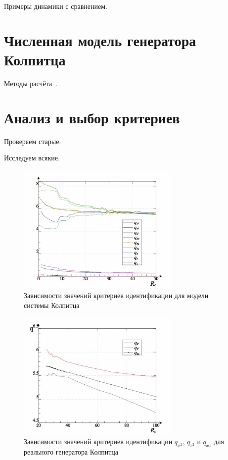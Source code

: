 Примеры динамики с сравнением.


\section{Численная модель генератора Колпитца}  %

Методы расчёта~\cite{zaeplnii_radio_calc}.


\section{Анализ и выбор критериев}  %

Проверяем старые.

Исследуем всякие.

\begin{figure}[htb!]
\centerline{\includegraphics[width=0.7\textwidth]{p/colp_bjt_q-p_Rc_q.png} }
\caption{Зависимости значений критериев идентификации для модели системы Колпитца}
\label{atu:f:colp_bjt_q-p_Rc_q}
\end{figure}


\begin{figure}[htb!]
\centerline{\includegraphics[width=0.7\textwidth]{p/colp_read_q-p_Rc_q.png} }
  \caption{Зависимости значений критериев идентификации $q_{x^2}$, $q_{z^2}$ и $q_{xz}$ для реального генератора Колпитца}
\label{atu:f:colp_read_q-p_Rc_q-p_Rc_q}
\end{figure}

